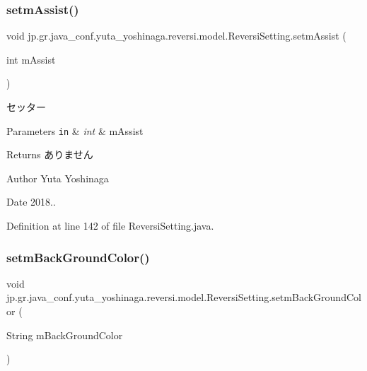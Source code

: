 \subsubsection{\texorpdfstring{setm\+Assist()}{setmAssist()}}
{\footnotesize\ttfamily void jp.\+gr.\+java\+\_\+conf.\+yuta\+\_\+yoshinaga.\+reversi.\+model.\+Reversi\+Setting.\+setm\+Assist (\begin{DoxyParamCaption}\item[{int}]{m\+Assist }\end{DoxyParamCaption})}



セッター 


\begin{DoxyParams}[1]{Parameters}
\mbox{\tt in}  & {\em int} & m\+Assist \\
\hline
\end{DoxyParams}
\begin{DoxyReturn}{Returns}
ありません 
\end{DoxyReturn}
\begin{DoxyAuthor}{Author}
Yuta Yoshinaga 
\end{DoxyAuthor}
\begin{DoxyDate}{Date}
2018.. 
\end{DoxyDate}


Definition at line 142 of file Reversi\+Setting.\+java.

\mbox{\label{classjp_1_1gr_1_1java__conf_1_1yuta__yoshinaga_1_1reversi_1_1model_1_1_reversi_setting_a37c81bf1c76cb33e00fcfb81d37fd12d}} 
\subsubsection{\texorpdfstring{setm\+Back\+Ground\+Color()}{setmBackGroundColor()}}
{\footnotesize\ttfamily void jp.\+gr.\+java\+\_\+conf.\+yuta\+\_\+yoshinaga.\+reversi.\+model.\+Reversi\+Setting.\+setm\+Back\+Ground\+Color (\begin{DoxyParamCaption}\item[{String}]{m\+Back\+Ground\+Color }\end{DoxyParamCaption})}



